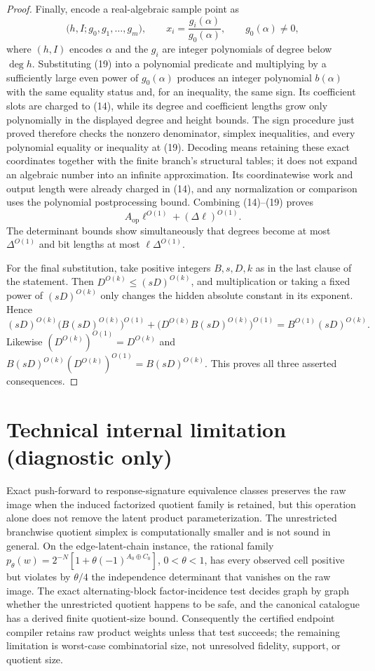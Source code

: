 \documentclass{article}
\begin{document}
\begin{proof}
Finally, encode a real-algebraic sample point as
\[
\bigl(h,I;g_0,g_1,\ldots,g_m\bigr),
\qquad
x_i=\frac{g_i(\alpha)}{g_0(\alpha)},
\qquad g_0(\alpha)\ne0,
\tag{19}
\]
where \((h,I)\) encodes \(\alpha\) and the \(g_i\) are integer polynomials of degree below \(\deg h\).  Substituting (19) into a polynomial predicate and multiplying by a sufficiently large even power of \(g_0(\alpha)\) produces an integer polynomial \(b(\alpha)\) with the same equality status and, for an inequality, the same sign.  Its coefficient slots are charged to (14), while its degree and coefficient lengths grow only polynomially in the displayed degree and height bounds.  The sign procedure just proved therefore checks the nonzero denominator, simplex inequalities, and every polynomial equality or inequality at (19).  Decoding means retaining these exact coordinates together with the finite branch's structural tables; it does not expand an algebraic number into an infinite approximation.  Its coordinatewise work and output length were already charged in (14), and any normalization or comparison uses the polynomial postprocessing bound.  Combining (14)--(19) proves
\[
A_{\mathrm{op}}\ell^{O(1)}+(\Delta\ell)^{O(1)}.
\]
The determinant bounds show simultaneously that degrees become at most \(\Delta^{O(1)}\) and bit lengths at most \(\ell\Delta^{O(1)}\).

For the final substitution, take positive integers \(B,s,D,k\) as in the last clause of the statement.  Then \(D^{O(k)}\le(sD)^{O(k)}\), and multiplication or taking a fixed power of \((sD)^{O(k)}\) only changes the hidden absolute constant in its exponent.  Hence
\[
(sD)^{O(k)}\bigl(B(sD)^{O(k)}\bigr)^{O(1)}
+\bigl(D^{O(k)}B(sD)^{O(k)}\bigr)^{O(1)}
=B^{O(1)}(sD)^{O(k)}.
\]
Likewise \((D^{O(k)})^{O(1)}=D^{O(k)}\) and \(B(sD)^{O(k)}(D^{O(k)})^{O(1)}=B(sD)^{O(k)}\).  This proves all three asserted consequences.
\end{proof}

\section*{Technical internal limitation (diagnostic only)}

Exact push-forward to response-signature equivalence classes preserves the raw image when the induced factorized quotient family is retained, but this operation alone does not remove the latent product parameterization. The unrestricted branchwise quotient simplex is computationally smaller and is not sound in general. On the edge-latent-chain instance, the rational family \(p_\theta(w)=2^{-N}[1+\theta(-1)^{A_0\mathbin\oplus C_0}]\), \(0<\theta<1\), has every observed cell positive but violates by \(\theta/4\) the independence determinant that vanishes on the raw image. The exact alternating-block factor-incidence test decides graph by graph whether the unrestricted quotient happens to be safe, and the canonical catalogue has a derived finite quotient-size bound. Consequently the certified endpoint compiler retains raw product weights unless that test succeeds; the remaining limitation is worst-case combinatorial size, not unresolved fidelity, support, or quotient size.
\end{document}
